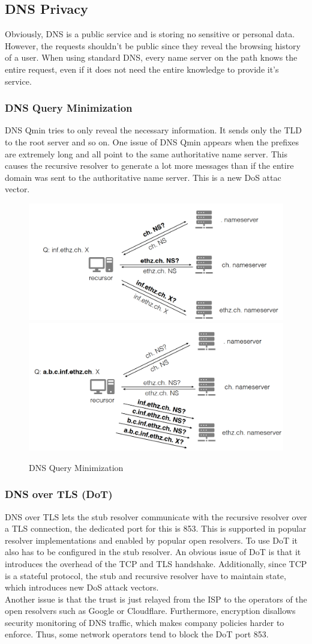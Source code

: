 \subsection{DNS Privacy}
Obviously, DNS is a public service and is storing no sensitive or personal data. However, the requests shouldn't be public since they reveal the browsing history of a user. When using standard DNS, every name server on the path knows the entire request, even if it does not need the entire knowledge to provide it's service.

\subsubsection{DNS Query Minimization}
DNS Qmin tries to only reveal the necessary information. It sends only the TLD to the root server and so on. 
One issue of DNS Qmin appears when the prefixes are extremely long and all point to the same authoritative name server. This causes the recursive resolver to generate a lot more messages than if the entire domain was sent to the authoritative name server. This is a new DoS attac vector.
\begin{figure}[H]
\centering
\includegraphics[width=.49\textwidth]{images/qmin.PNG}
\includegraphics[width=.49\textwidth]{images/qmin_dos.PNG}
\caption{DNS Query Minimization}
\label{qmin}
\end{figure}

\subsubsection{DNS over TLS (DoT)}
DNS over TLS lets the stub resolver communicate with the recursive resolver over a TLS connection, the dedicated port for this is 853. This is supported in popular resolver implementations and enabled by popular open resolvers. To use DoT it also has to be configured in the stub resolver. An obvious issue of DoT is that it introduces the overhead of the TCP and TLS handshake. Additionally, since TCP is a stateful protocol, the stub and recursive resolver have to maintain state, which introduces new DoS attack vectors.\\
Another issue is that the trust is just relayed from the ISP to the operators of the open resolvers such as Google or Cloudflare. Furthermore, encryption disallows security monitoring of DNS traffic, which makes company policies harder to enforce. Thus, some network operators tend to block the DoT port 853.

